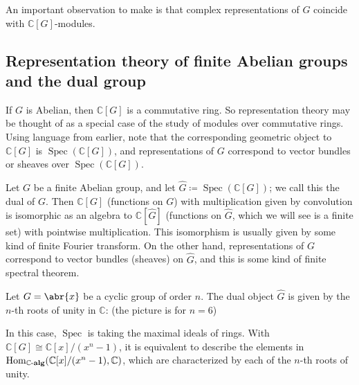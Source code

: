 \documentclass[11pt,leqno]{article}
\theoremstyle{plain}
\theoremstyle{definition}
\numberwithin{equation}{section}
\numberwithin{lem}{section}
\DeclareMathOperator{\Hom}{Hom}
\DeclareMathOperator{\Spec}{Spec}
\newcommand{\catname}[1]{{\normalfont\mathbf{#1}}}
\newcommand{\alg}{\text{-}\catname{alg}}
\begin{document}
An important observation to make is that complex representations of $G$ coincide with $\mathbb C[G]$-modules. 

\subsection{Representation theory of finite Abelian groups and the dual group}
If $G$ is Abelian, then $\mathbb C[G]$ is a commutative ring. So representation theory may be thought of as a special case of the study of modules over commutative rings. Using language from earlier, note that the corresponding geometric object to $\mathbb C[G]$ is $\Spec(\mathbb C[G])$, and representations of $G$ correspond to vector bundles or sheaves over $\Spec(\mathbb C[G])$.

Let $G$ be a finite Abelian group, and let $\widehat G\coloneqq \Spec(\mathbb C[G])$; we call this the dual of $G$. Then $\mathbb C[G]$ (functions on $G$) with multiplication given by convolution is isomorphic as an algebra to $\mathbb C[\widehat G]$ (functions on $\widehat{G}$, which we will see is a finite set) with pointwise multiplication. This isomorphism is usually given by some kind of finite Fourier transform. On the other hand, representations of $G$ correspond to vector bundles (sheaves) on $\widehat G$, and this is some kind of finite spectral theorem.

Let $G = \abr{x}$ be a cyclic group of order $n$. The dual object $\widehat{G}$ is given by the $n$-th roots of unity in $\mathbb C$: (the picture is for $n=6$)

\begin{figure}[h]
  \centering
\end{figure}

In this case, $\Spec$ is taking the maximal ideals of rings. With $\mathbb C[G]\cong \mathbb C[x]/(x^n-1)$, it is equivalent to describe the elements in $\Hom_{\mathbb C\alg}(\mathbb C[x]/(x^n-1),\mathbb C)$, which are characterized by each of the $n$-th roots of unity.
\end{document}
